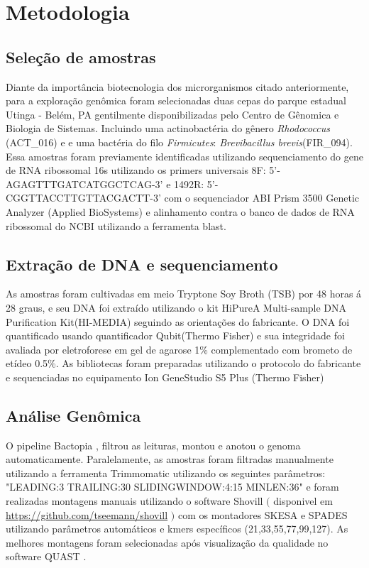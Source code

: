 \chapter{Metodologia}
\section{Seleção de amostras}

Diante da importância biotecnologia dos microrganismos citado anteriormente, 
para a exploração genômica foram selecionadas duas cepas do parque estadual Utinga - Belém, PA gentilmente disponibilizadas pelo Centro de Gênomica e Biologia de Sistemas.
Incluindo uma actinobactéria do gênero \textit{Rhodococcus} (ACT\_016) e e uma bactéria do filo \textit{Firmicutes}: \textit{Brevibacillus brevis}(FIR\_094).
Essa amostras foram previamente identificadas utilizando sequenciamento do gene de RNA ribossomal 16s
utilizando os primers universais 8F: 5'-AGAGTTTGATCATGGCTCAG-3' e 1492R: 5'-CGGTTACCTTGTTACGACTT-3' com o sequenciador 
ABI Prism 3500 Genetic Analyzer (Applied BioSystems) e alinhamento contra o banco de dados de RNA ribossomal do NCBI utilizando a ferramenta
blast.

\section{Extração de DNA e sequenciamento}
As amostras foram cultivadas em meio Tryptone Soy Broth (TSB) por 48 horas á 28 graus, e
seu DNA foi extraído utilizando o kit HiPureA Multi-sample DNA Purification Kit(HI-MEDIA) seguindo as orientações
do fabricante. O DNA foi quantificado usando quantificador Qubit(Thermo Fisher) e sua integridade foi 
avaliada por eletroforese em gel de agarose 1\% complementado com brometo de etídeo 0.5\%.
As bibliotecas foram preparadas utilizando o protocolo do fabricante e sequenciadas no equipamento
Ion GeneStudio S5 Plus (Thermo Fisher)

\section{Análise Genômica}
O pipeline Bactopia \cite{Bactopia}, filtrou as leituras, montou e anotou o genoma automaticamente.
Paralelamente, as amostras foram filtradas manualmente utilizando a ferramenta Trimmomatic \cite{bolger2014trimmomatic}
utilizando os seguintes parâmetros: "LEADING:3 TRAILING:30 SLIDINGWINDOW:4:15 MINLEN:36"
e foram realizadas montagens manuais utilizando o software Shovill $($ disponivel em \url{https://github.com/tseemann/shovill} $)$ com os 
montadores SKESA\cite{souvorov2018skesa} e SPADES\cite{bankevich2012spades} utilizando
parâmetros automáticos e kmers específicos (21,33,55,77,99,127).
As melhores montagens foram selecionadas após visualização da qualidade no software QUAST \cite{gurevich2013quast}. 

